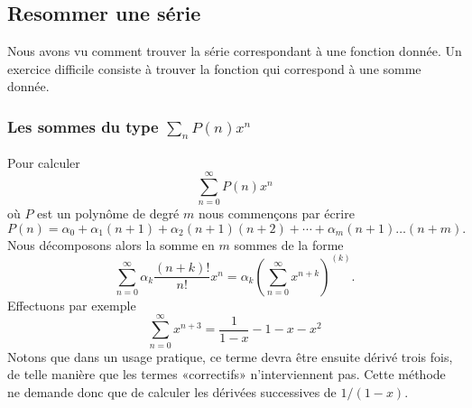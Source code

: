 \subsection{Resommer une série}

Nous avons vu comment trouver la série correspondant à une fonction donnée. Un exercice difficile consiste à trouver la fonction qui correspond à une somme donnée.

\subsubsection{Les sommes du type \texorpdfstring{$ \sum_nP(n)x^n$}{P}}

Pour calculer
\begin{equation}
    \sum_{n=0}^{\infty}P(n)x^n
\end{equation}
où \( P\) est un polynôme de degré \( m\) nous commençons par écrire
\begin{equation}
    P(n)=\alpha_0+\alpha_1(n+1)+\alpha_2(n+1)(n+2)+\cdots +\alpha_m(n+1)\ldots (n+m).
\end{equation}
Nous décomposons alors la somme en \( m\) sommes de la forme
\begin{equation}
    \sum_{n=0}^{\infty}\alpha_k\frac{ (n+k)! }{ n! }x^n=\alpha_k\left( \sum_{n=0}^{\infty}x^{n+k} \right)^{(k)}.
\end{equation}
Effectuons par exemple
\begin{equation}
    \sum_{n=0}^{\infty}x^{n+3}=\frac{1}{ 1-x }-1-x-x^2
\end{equation}
Notons que dans un usage pratique, ce terme devra être ensuite dérivé trois fois, de telle manière que les termes «correctifs» n'interviennent pas. Cette méthode ne demande donc que de calculer les dérivées successives de \( 1/(1-x)\).

